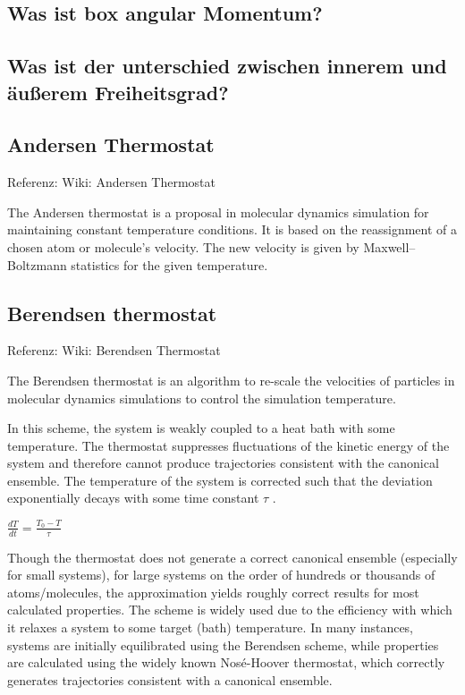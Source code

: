 \documentclass[]{article}
\begin{document}
\subsection*{Was ist box angular Momentum?}

\subsection{Was ist der unterschied zwischen innerem und äußerem Freiheitsgrad?}

\subsection{Andersen Thermostat}
Referenz: Wiki: Andersen Thermostat

The Andersen thermostat is a proposal in molecular dynamics simulation for maintaining constant temperature conditions. It is based on the reassignment of a chosen atom or molecule's velocity. The new velocity is given by Maxwell–Boltzmann statistics for the given temperature.

\subsection{Berendsen thermostat}
Referenz: Wiki: Berendsen Thermostat

The Berendsen thermostat is an algorithm to re-scale the velocities of particles in molecular dynamics simulations to control the simulation temperature.

In this scheme, the system is weakly coupled to a heat bath with some temperature. The thermostat suppresses fluctuations of the kinetic energy of the system and therefore cannot produce trajectories consistent with the canonical ensemble. The temperature of the system is corrected such that the deviation exponentially decays with some time constant $\tau$ .

$\frac{dT}{dt}=\frac{T_0-T}{\tau}$

Though the thermostat does not generate a correct canonical ensemble (especially for small systems), for large systems on the order of hundreds or thousands of atoms/molecules, the approximation yields roughly correct results for most calculated properties. The scheme is widely used due to the efficiency with which it relaxes a system to some target (bath) temperature. In many instances, systems are initially equilibrated using the Berendsen scheme, while properties are calculated using the widely known Nosé-Hoover thermostat, which correctly generates trajectories consistent with a canonical ensemble.
\end{document}

